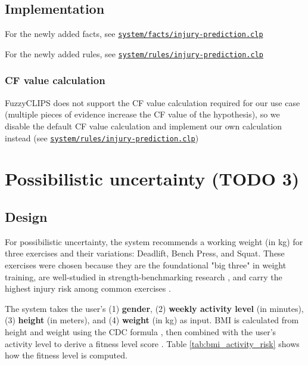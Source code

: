 \documentclass{article}
\begin{document}
\subsection{Implementation}

For the newly added facts, see \href{https://github.com/joshpham97/COMP474Project_OptionB_PhamTran_ExerciseRecommender/blob/main/system/facts/injury-prediction.clp}{\texttt{system/facts/injury-prediction.clp}}

\noindent For the newly added rules, see \href{https://github.com/joshpham97/COMP474Project_OptionB_PhamTran_ExerciseRecommender/blob/main/system/rules/injury-prediction.clp}{\texttt{system/rules/injury-prediction.clp}}

\subsubsection{CF value calculation}

FuzzyCLIPS does not support the CF value calculation required for our use case (multiple pieces of evidence increase the CF value of the hypothesis), so we disable the default CF value calculation and implement our own calculation instead (see \href{https://github.com/joshpham97/COMP474Project_OptionB_PhamTran_ExerciseRecommender/blob/main/system/rules/injury-prediction.clp#L85-L108}{\texttt{system/rules/injury-prediction.clp}})

\section{Possibilistic uncertainty (TODO 3)}

\subsection{Design}

For possibilistic uncertainty, the system recommends a working weight (in kg) for three exercises and their variations: Deadlift, Bench Press, and Squat. These exercises were chosen because they are the foundational "big three" in weight training, are well-studied in strength-benchmarking research \cite{exerciseModifier}, and carry the highest injury risk among common exercises \cite{injuryFactors}.

The system takes the user's (1) \textbf{gender}, (2) \textbf{weekly activity level} (in minutes), (3) \textbf{height} (in meters), and (4) \textbf{weight} (in kg) as input. BMI is calculated from height and weight using the CDC formula \cite{bmi}, then combined with the user's activity level to derive a fitness level score \cite{fitnessLevel}. Table \ref{tab:bmi_activity_risk} shows how the fitness level is computed.
\end{document}
